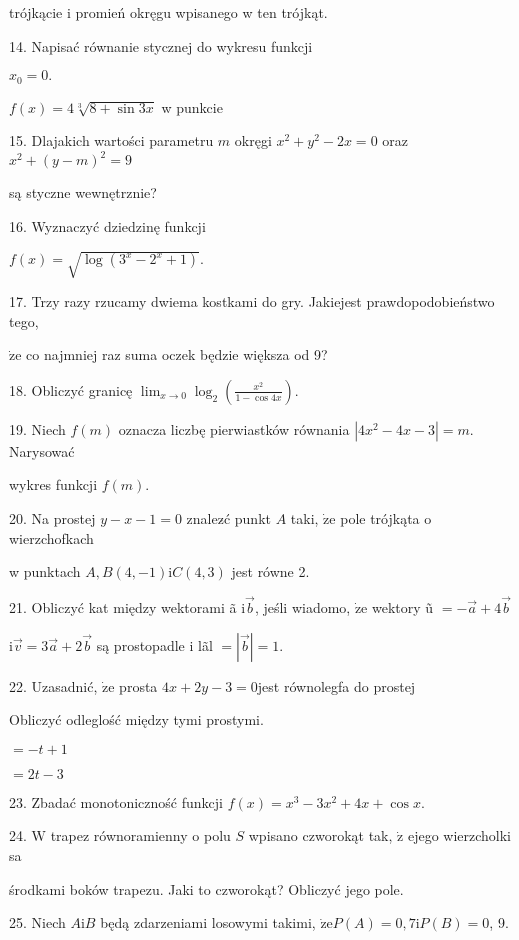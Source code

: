 \documentclass[a4paper,12pt]{article}
\begin{document}
trójkącie i promień okręgu wpisanego w ten trójkąt.

14. Napisać równanie stycznej do wykresu funkcji

$x_{0}=0.$

$f(x)=4\sqrt[3]{8+\sin 3x}$ w punkcie

15. Dlajakich wartości parametru $m$ okręgi $x^{2}+y^{2}-2x=0$ oraz $x^{2}+(y-m)^{2}=9$

są styczne wewnętrznie?




16. Wyznaczyć dziedzinę funkcji

$f(x)=\sqrt{\log(3^{x}-2^{x}+1)}.$

17. Trzy razy rzucamy dwiema kostkami do gry. Jakiejest prawdopodobieństwo tego,

$\dot{\mathrm{z}}\mathrm{e}$ co najmniej raz suma oczek będzie większa od 9?

18. Obliczyć granicę $\displaystyle \lim_{x\rightarrow 0}\log_{2}(\frac{x^{2}}{1-\cos 4x}).$

19. Niech $f(m)$ oznacza liczbę pierwiastków równania $|4x^{2}-4x-3|=m$. Narysować

wykres funkcji $f(m).$

20. Na prostej $y-x-1=0$ znalez$\acute{}$ć punkt $A$ taki, $\dot{\mathrm{z}}\mathrm{e}$ pole trójkąta o wierzchofkach

w punktach $A, B(4,-1)\mathrm{i}C(4,3)$ jest równe 2.

21. Obliczyć kat między wektorami ã $\mathrm{i}\vec{b}$, jeśli wiadomo, $\dot{\mathrm{z}}\mathrm{e}$ wektory ũ $= -\vec{a}+4\vec{b}$

$\mathrm{i}\vec{v}=3\vec{a}+2\vec{b}$ są prostopadle i lãl $=|\vec{b}|=1.$

22. Uzasadnić, $\dot{\mathrm{z}}\mathrm{e}$ prosta $4x+2y-3=0$jest równolegfa do prostej 

Obliczyć odleglość między tymi prostymi.

$= -t+1$

$= 2t-3$

23. Zbadać monotoniczność funkcji $f(x)=x^{3}-3x^{2}+4x+\cos x.$

24. $\mathrm{W}$ trapez równoramienny o polu $S$ wpisano czworokąt tak, $\dot{\mathrm{z}}$ ejego wierzcholki sa

środkami boków trapezu. Jaki to czworokąt? Obliczyć jego pole.

25. Niech $A\mathrm{i}B$ będą zdarzeniami losowymi takimi, $\dot{\mathrm{z}}\mathrm{e}P(A) =0, 7\mathrm{i}P(B) =0$, 9.
\end{document}
